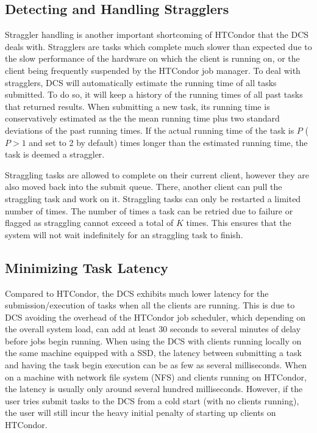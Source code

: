 \documentclass{article}
\begin{document}
\subsection{Detecting and Handling Stragglers}

Straggler handling is another important shortcoming of HTCondor that the DCS deals with. Stragglers are tasks which complete much slower than expected due to the slow performance of the hardware on which the client is running on, or the client being frequently suspended by the HTCondor job manager. To deal with stragglers, DCS will automatically estimate the running time of all tasks submitted. To do so, it will keep a history of the running times of all past tasks that returned results. When submitting a new task, its running time is conservatively estimated as the the mean running time plus two standard deviations of the past running times. If the actual running time of the task is $P$ ($P>1$ and set to 2 by default) times longer than the estimated running time, the task is deemed a straggler.

Straggling tasks are allowed to complete on their current client, however they are also moved back into the submit queue. There, another client can pull the straggling task and work on it. Straggling tasks can only be restarted a limited number of times. The number of times a task can be retried due to failure or flagged as straggling cannot exceed a total of $K$ times. This ensures that the system will not wait indefinitely for an straggling task to finish.

\subsection{Minimizing Task Latency}

Compared to HTCondor, the DCS exhibits much lower latency for the submission/execution of tasks when all the clients are running. This is due to DCS avoiding the overhead of the HTCondor job scheduler, which depending on the overall system load, can add at least 30 seconds to several minutes of delay before jobs begin running. When using the DCS with clients running locally on the same machine equipped with a SSD, the latency between submitting a task and having the task begin execution can be as few as several milliseconds. When on a machine with network file system (NFS) \cite{sandberg1985design} and clients running on HTCondor, the latency is usually only around several hundred milliseconds. However, if the user tries submit tasks to the DCS from a cold start (with no clients running), the user will still incur the heavy initial penalty of starting up clients on HTCondor.
\end{document}
